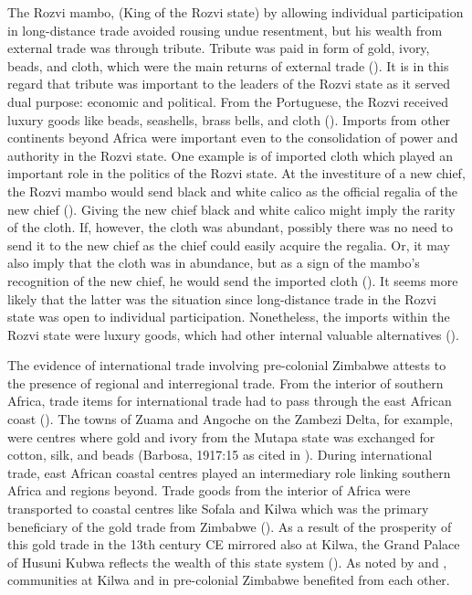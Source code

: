 The Rozvi mambo, (King of the Rozvi state) by allowing individual participation in long-distance trade avoided rousing undue resentment, but his wealth from external trade was through tribute. Tribute was paid in form of gold, ivory, beads, and cloth, which were the main returns of external trade (\cite[][]{mudenge1974}). It is in this regard that tribute was important to the leaders of the Rozvi state as it served dual purpose: economic and political. From the Portuguese, the Rozvi received luxury goods like beads, seashells, brass bells, and cloth (\cite[][]{mudenge1974}). Imports from other continents beyond Africa were important even to the consolidation of power and authority in the Rozvi state. One example is of imported cloth which played an important role in the politics of the Rozvi state. At the investiture of a new chief, the Rozvi mambo would send black and white calico as the official regalia of the new chief (\cites[][]{mudenge1974}[][]{bvocho2005}). Giving the new chief black and white calico might imply the rarity of the cloth. If, however,  the cloth was abundant, possibly there was no need to send it to the new chief as the chief could easily acquire the regalia. Or, it may also imply that the cloth was in abundance, but as a sign of the mambo’s recognition of the new chief, he would send the imported cloth (\cite[][]{bvocho2005}). It seems more likely that the latter was the situation since long-distance trade in the Rozvi state was open to individual participation. Nonetheless, the imports within the Rozvi state were luxury goods, which had other internal valuable alternatives (\cite[][]{mudenge1974}).

The evidence of international trade involving pre-colonial Zimbabwe attests to the presence of regional and interregional trade. From the interior of southern Africa, trade items for international trade had to pass through the east African coast (\cite[][]{pwiti2005}). The towns of Zuama and Angoche on the Zambezi Delta, for example, were centres where gold and ivory from the Mutapa state was exchanged for cotton, silk, and beads (Barbosa, 1917:15 as cited in \cite[][130]{kusimba1999}). During international trade, east African coastal centres played an intermediary role linking southern Africa and regions beyond. Trade goods from the interior of Africa were transported to coastal centres like Sofala and Kilwa which was the primary beneficiary of the gold trade from Zimbabwe (\cites[][]{miller2000}[][]{pwiti2005}[][]{pikirayi2006}[][]{huffman2009}). As a result of the prosperity of this gold trade in the 13th century CE mirrored also at Kilwa, the Grand Palace of Husuni Kubwa reflects the wealth of this state system (\cites[][]{pikirayi2006}[][]{pikirayi2017}). As noted by \textcite[][387]{pwiti2005} and \textcite[][]{pikirayi2017}, communities at Kilwa and in pre-colonial Zimbabwe benefited from each other.

